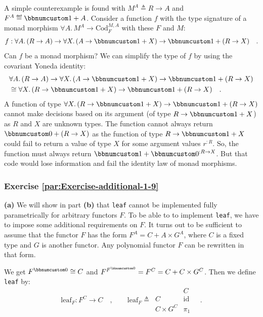 A simple counterexample is found with $M^{A}\triangleq R\rightarrow A$
and $F^{A}\triangleq\bbnum 1+A$. Consider a function $f$ with the
type signature of a monad morphism $\forall A.\,M^{A}\rightarrow\text{Cod}_{F}^{M,A}$
with these $F$ and $M$:
\[
f:\forall A.\,(R\rightarrow A)\rightarrow\forall X.\,(A\rightarrow\bbnum 1+X)\rightarrow\bbnum 1+(R\rightarrow X)\quad.
\]
Can $f$ be a monad morphism? We can simplify the type of $f$ by
using the covariant Yoneda identity:
\begin{align*}
 & \forall A.\,(R\rightarrow A)\rightarrow\forall X.\,(A\rightarrow\bbnum 1+X)\rightarrow\bbnum 1+(R\rightarrow X)\\
 & \cong\forall X.\,(R\rightarrow\bbnum 1+X)\rightarrow\bbnum 1+(R\rightarrow X)\quad.
\end{align*}
A function of type $\forall X.\,(R\rightarrow\bbnum 1+X)\rightarrow\bbnum 1+(R\rightarrow X)$
cannot make decisions based on its argument (of type $R\rightarrow\bbnum 1+X$)
as $R$ and $X$ are unknown types. The function cannot always return
$\bbnum 0+(R\rightarrow X)$ as the function of type $R\rightarrow\bbnum 1+X$
could fail to return a value of type $X$ for some argument values
$r^{:R}$. So, the function must always return $\bbnum 1+\bbnum 0^{:R\rightarrow X}$.
But that code would lose information and fail the identity law of
monad morphisms.


\subsubsection*{Exercise \ref{par:Exercise-additional-1-9}}

\textbf{(a)} We will show in part \textbf{(b)} that \lstinline!leaf!
cannot be implemented fully parametrically for arbitrary functors
$F$. To be able to to implement \lstinline!leaf!, we have to impose
some additional requirements on $F$. It turns out to be sufficient
to assume that the functor $F$ has the form $F^{A}=C+A\times G^{A}$,
where $C$ is a fixed type and $G$ is another functor. Any polynomial
functor $F$ can be rewritten in that form.

We get $F^{\bbnum 0}\cong C$ and $F^{F^{\bbnum 0}}=F^{C}=C+C\times G^{C}$.
Then we define \lstinline!leaf! by:
\[
\text{leaf}_{F}:F^{C}\rightarrow C\quad,\quad\quad\text{leaf}_{F}\triangleq\,\begin{array}{|c||c|}
 & C\\
\hline C & \text{id}\\
C\times G^{C} & \pi_{1}
\end{array}\quad.
\]

